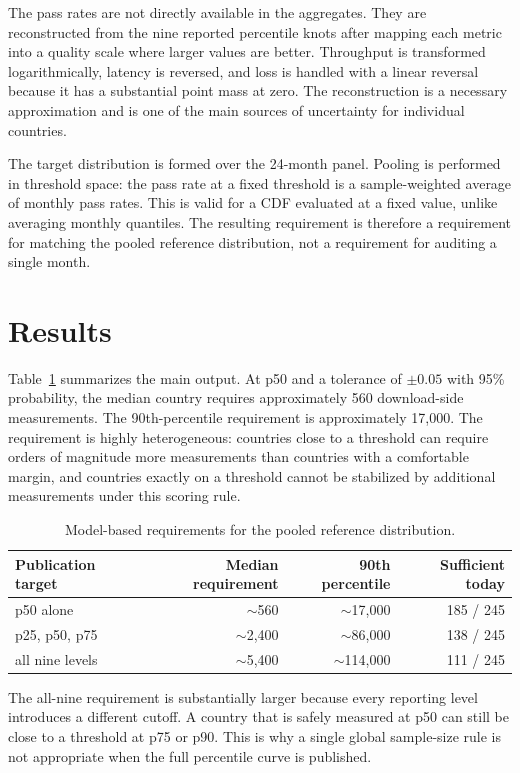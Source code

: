 \documentclass[11pt]{article}
\begin{document}
The pass rates are not directly available in the aggregates. They are reconstructed from the nine
reported percentile knots after mapping each metric into a quality scale where larger values are
better. Throughput is transformed logarithmically, latency is reversed, and loss is handled with a
linear reversal because it has a substantial point mass at zero. The reconstruction is a necessary
approximation and is one of the main sources of uncertainty for individual countries.

The target distribution is formed over the 24-month panel. Pooling is performed in threshold space:
the pass rate at a fixed threshold is a sample-weighted average of monthly pass rates. This is valid
for a CDF evaluated at a fixed value, unlike averaging monthly quantiles. The resulting requirement
is therefore a requirement for matching the pooled reference distribution, not a requirement for
auditing a single month.

\section{Results}

Table~\ref{tab:requirements} summarizes the main output. At p50 and a tolerance of $\pm0.05$ with
95\% probability, the median country requires approximately 560 download-side measurements. The
90th-percentile requirement is approximately 17,000. The requirement is highly heterogeneous:
countries close to a threshold can require orders of magnitude more measurements than countries
with a comfortable margin, and countries exactly on a threshold cannot be stabilized by additional
measurements under this scoring rule.

\begin{table}[ht]
\centering
\caption{Model-based requirements for the pooled reference distribution.}
\label{tab:requirements}
\begin{tabular}{lrrr}
\toprule
Publication target & Median requirement & 90th percentile & Sufficient today \\
\midrule
p50 alone & $\sim$560 & $\sim$17,000 & 185 / 245 \\
p25, p50, p75 & $\sim$2,400 & $\sim$86,000 & 138 / 245 \\
all nine levels & $\sim$5,400 & $\sim$114,000 & 111 / 245 \\
\bottomrule
\end{tabular}
\end{table}

The all-nine requirement is substantially larger because every reporting level introduces a
different cutoff. A country that is safely measured at p50 can still be close to a threshold at p75
or p90. This is why a single global sample-size rule is not appropriate when the full percentile
curve is published.
\end{document}
